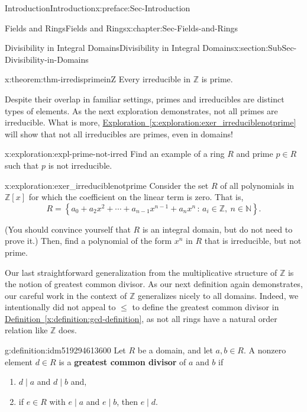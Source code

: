 \documentclass[oneside,10pt,]{book}
\newcommand{\xreffont}{\relax}
\newcommand{\terminology}[1]{\textbf{#1}}
\numberwithin{equation}{section}
\renewcommand{\le}{\leqslant}
\newcommand{\setof}[2]{{\left\{#1\,\colon\,#2\right\}}}
\def\Z{{\mathbb Z}}
\def\N{{\mathbb N}}
\begin{document}
\begin{preface}{Introduction}{}{Introduction}{}{}{x:preface:Sec-Introduction}
\begin{chapterptx}{Fields and Rings}{}{Fields and Rings}{}{}{x:chapter:Sec-Fields-and-Rings}
\begin{sectionptx}{Divisibility in Integral Domains}{}{Divisibility in Integral Domains}{}{}{x:section:SubSec-Divisibility-in-Domains}
\begin{theorem}{}{}{x:theorem:thm-irredisprimeinZ}%
Every irreducible in \(\Z\) is prime.%
\end{theorem}
Despite their overlap in familiar settings, primes and irreducibles are distinct types of elements. As the next exploration demonstrates, not all primes are irreducible. What is more, \hyperref[x:exploration:exer_irreduciblenotprime]{Exploration~{\xreffont\ref{x:exploration:exer_irreduciblenotprime}}} will show that not all irreducibles are primes, even in domains!%
\begin{exploration}{}{x:exploration:expl-prime-not-irred}%
Find an example of a ring \(R\) and prime \(p\in R\) such that \(p\) is not irreducible.%
\end{exploration}
\begin{exploration}{}{x:exploration:exer_irreduciblenotprime}%
Consider the set \(R\) of all polynomials in \(\Z[x]\) for which the coefficient on the linear term is zero. That is,%
\begin{equation*}
R = \setof{a_0 + a_2 x^2 + \cdots + a_{n-1} x^{n-1} + a_n x^n}{a_i\in \Z,\ n\in\N}\text{.}
\end{equation*}
%
\par
(You should convince yourself that \(R\) is an integral domain, but do not need to prove it.) Then, find a polynomial of the form \(x^n\) in \(R\) that is irreducible, but not prime.%
\end{exploration}
Our last straightforward generalization from the multiplicative structure of \(\Z\) is the notion of greatest common divisor. As our next definition again demonstrates, our careful work in the context of \(\Z\) generalizes nicely to all domains. Indeed, we intentionally did not appeal to \(\le\) to define the greatest common divisor in \hyperref[x:definition:gcd-definition]{Definition~{\xreffont\ref{x:definition:gcd-definition}}}, as not all rings have a natural order relation like \(\Z\) does.%
\begin{definition}{}{g:definition:idm519294613600}%
%
Let \(R\) be a domain, and let \(a,b\in R\). A nonzero element \(d\in R\) is a \terminology{greatest common divisor} of \(a\) and \(b\) if%
\begin{enumerate}
\item{}\(d\mid a\) and \(d\mid b\) and,%
\item{}if \(e\in R\) with \(e\mid a\) and \(e\mid b\), then \(e\mid d\).%
\end{enumerate}

\end{definition}
\end{sectionptx}
\end{chapterptx}
\end{preface}
\end{document}
